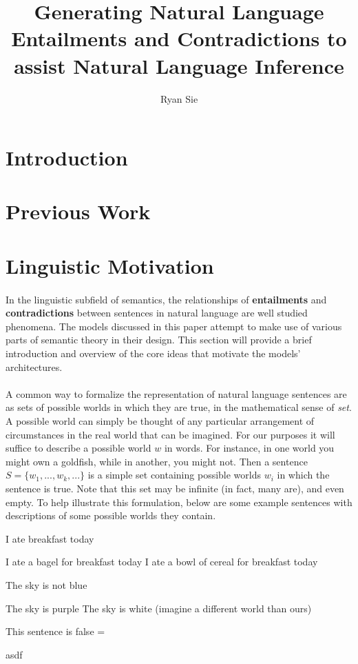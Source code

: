 \documentclass[a4paper, 12pt]{article}
\title{Generating Natural Language Entailments and Contradictions to assist Natural Language Inference}
\date{}
\author{Ryan Sie}
\theoremstyle{definition}
\begin{document}
\maketitle

\section{Introduction}

\section{Previous Work}

\section{Linguistic Motivation}

\paragraph{}

In the linguistic subfield of semantics, the relationships of \textbf{entailments} and \textbf{contradictions} between sentences in natural language are well studied phenomena. The models discussed in this paper attempt to make use of various parts of semantic theory in their design. This section will provide a brief introduction and overview of the core ideas that motivate the models' architectures.

\paragraph{}

A common way to formalize the representation of natural language sentences are as sets of possible worlds in which they are true, in the mathematical sense of \textit{set}. A possible world can simply be thought of any particular arrangement of circumstances in the real world that can be imagined. For our purposes it will suffice to describe a possible world $w$ in words. For instance, in one world you might own a goldfish, while in another, you might not. Then a sentence $S = \{w_1, ..., w_k, ...\}$ is a simple set containing possible worlds $w_i$ in which the sentence is true. Note that this set may be infinite (in fact, many are), and even empty. To help illustrate this formulation, below are some example sentences with descriptions of some possible worlds they contain.

\begin{exe}
\ex I ate breakfast today
	\begin{xlist} 
		\ex I ate a bagel for breakfast today	
		\ex I ate a bowl of cereal for breakfast today
	\end{xlist}
\ex The sky is not blue
	\begin{xlist} 
		\ex The sky is purple
		\ex The sky is white (imagine a different world than ours)
	\end{xlist}
\ex This sentence is false = 
	\begin{xlist}
		\ex asdf
	\end{xlist}
\end{exe}
\end{document}
